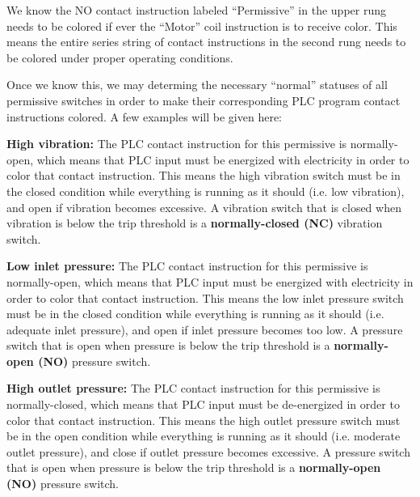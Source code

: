 \documentclass[12pt,a4paper]{article}
\begin{document}
We know the NO contact instruction labeled ``Permissive'' in the upper rung needs to be colored if ever the ``Motor'' coil instruction is to receive color.  This means the entire series string of contact instructions in the second rung needs to be colored under proper operating conditions.

\vskip 10pt

Once we know this, we may determing the necessary ``normal'' statuses of all permissive switches in order to make their corresponding PLC program contact instructions colored.  A few examples will be given here:

\vskip 10pt

\noindent
{\bf High vibration:} The PLC contact instruction for this permissive is normally-open, which means that PLC input must be energized with electricity in order to color that contact instruction.  This means the high vibration switch must be in the closed condition while everything is running as it should (i.e. low vibration), and open if vibration becomes excessive.  A vibration switch that is closed when vibration is below the trip threshold is a {\bf normally-closed (NC)} vibration switch.

\vskip 10pt

\noindent
{\bf Low inlet pressure:} The PLC contact instruction for this permissive is normally-open, which means that PLC input must be energized with electricity in order to color that contact instruction.  This means the low inlet pressure switch must be in the closed condition while everything is running as it should (i.e. adequate inlet pressure), and open if inlet pressure becomes too low.  A pressure switch that is open when pressure is below the trip threshold is a {\bf normally-open (NO)} pressure switch.

\vskip 10pt

\noindent
{\bf High outlet pressure:} The PLC contact instruction for this permissive is normally-closed, which means that PLC input must be de-energized in order to color that contact instruction.  This means the high outlet pressure switch must be in the open condition while everything is running as it should (i.e. moderate outlet pressure), and close if outlet pressure becomes excessive.  A pressure switch that is open when pressure is below the trip threshold is a {\bf normally-open (NO)} pressure switch.

\vskip 10pt

\vskip 10pt \filbreak 
\end{document}
